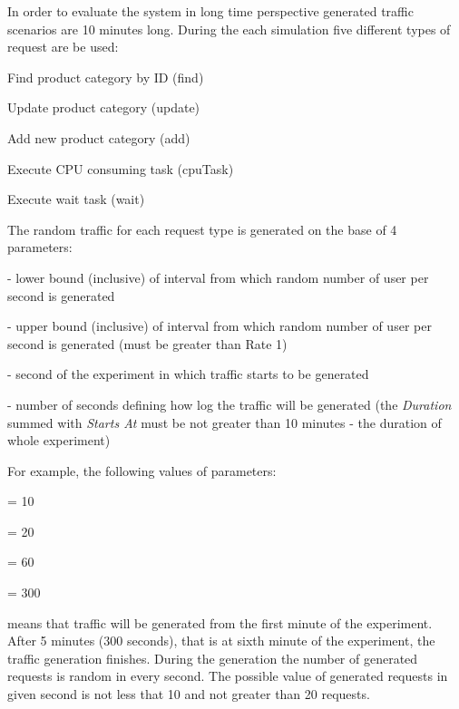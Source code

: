\documentclass[12pt,a4paper]{article}
\let\tempone\itemize
\let\temptwo\enditemize
\renewenvironment{itemize}{\tempone\addtolength{\itemsep}{-0.4\baselineskip}}{\temptwo}
\begin{document}
In order to evaluate the system in long time perspective generated traffic scenarios are 10 minutes long. 
During the each simulation five different types of request are be used:
\begin{itemize}
\item Find product category by ID (find)
\item Update product	category (update)
\item Add new product category (add)
\item Execute CPU consuming task (cpuTask)
\item Execute wait task (wait)
\end{itemize}

The random traffic for each request type is generated on the base of 4 parameters:
\begin{itemize}
\item[\textit{Rate1}] - lower bound (inclusive) of interval from which random number of user per second is generated
\item[\textit{Rate2}] - upper bound (inclusive) of interval from which random number of user per second is generated  (must be greater than Rate 1)
\item[\textit{StartAt}] - second of the experiment in which traffic starts to be generated
\item[\textit{Duration}] - number of seconds defining how log the traffic will be generated (the \textit{Duration} summed with \textit{Starts At} must be not greater than 10 minutes - the duration of whole experiment)
\end{itemize}

For example, the following values of parameters:

\begin{center}
\begin{itemize}
\item[\textit{Rate1}] = 10
\item[\textit{Rate2}] = 20
\item[\textit{StartAt}] = 60
\item[\textit{Duration}] = 300
\end{itemize}
\end{center}

means that traffic will be generated from the first minute of the experiment. After 5 minutes (300 seconds), that is at sixth minute of the experiment, the traffic generation finishes. During the generation the number of generated requests is random in every second. The possible value of generated requests in given second is not less that 10 and not greater than 20 requests. 
\end{document}
